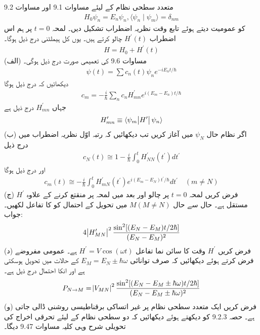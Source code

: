 متعدد سطحی نظام کے لیئے مساوات \num{9.1} اور مساوات \num{9.2} 
\begin{align}
	H_0\psi_n = E_n\psi_n, \langle \psi_n\mid\psi_m \rangle = \delta_{nm}
\end{align}
کو عمومیت دیتے ہوئے تابع وقت نظریہ اضطراب تشکیل دیں۔ لمحہ \(t=0\) پر ہم اس اضطراب \(H^\prime(t)\) چالو کرتے ہیں۔ یوں کل ہیملٹنی درج ذیل ہوگا۔
\begin{align}
	H = H_0 + H^\prime(t)
\end{align}
(الف) مساوات \num{9.6} کی تعمیمی صورت درج ذیل ہوگی۔
\begin{align}
	\psi(t) = \sum c_n(t)\psi_ne^{-iE_nt/\hbar}
\end{align}
دیکھائیں کہ درج ذیل ہوگا
\begin{align}
	c_m = -\frac{i}{\hbar}\sum_{n} c_nH^\prime_{mn}e^{i(E_m-E_n)t/\hbar}
\end{align}
جہاں \(H^\prime_{mn}\) درج ذیل ہے
\begin{align}
	H^\prime_{mn} \equiv \langle \psi_m\abs{H^\prime}\psi_n \rangle
\end{align}
(ب) اگر نظام حال \(\psi_N\) میں آغاز کریں تب دیکھائیں کہ رتبہ اوّل نظریہ اضطراب میں درج ذیل
\begin{align}
	c_N(t)\cong1-\frac{i}{\hbar}\int_{0}^{t}H^\prime_{NN}(t^\prime)dt^\prime
\end{align}
اور درج ذیل ہوگا
\begin{align}
	c_m(t)\cong-\frac{i}{\hbar}\int_{0}^{t}H^\prime_{mN}(t^\prime)e^{i(E_m-E_N)t^\prime/\hbar}dt^\prime \quad(m\neq N)
\end{align}
(ج) فرض کریں لمحہ \(t=0\) پر چالو اور بعد میں لمحہ  پر منقتع کرنے کے علاوہ \(H^\prime\) مستقل ہے۔ حال  سے حال \(M(M\neq N)\) میں تحویل کے احتمال کو  کا تفاعل لکھیں۔ جواب:
\begin{align}
	4\abs{H^\prime_{MN}}^2\frac{\sin^2[(E_N-E_M)t/2\hbar]}{(E_N-E_M)^2}
\end{align}
(د) فرض کریں \(H^\prime\) وقت کا سائن نما تفاعل \(H^\prime=V\cos(\omega t)\) ہے۔ عمومی مفروضے فرض کرتے ہوئے دیکھائیں کہ صرف توانائی \(E_M = E_N\pm\hbar\omega\) کے حالات میں تحویل ہوسکتی ہے اور انکا احتمال درج ذیل ہے۔
\begin{align}
	P_{N\rightarrow M} = \abs{V_{MN}}^2\frac{\sin^2[(E_N-E_M\pm\hbar\omega)t/2\hbar]}{(E_N-E_M\pm\hbar\omega)^2}
\end{align}
(و) فرض کریں ایک متعدد سطحی نظام پر غیر اتساکی برقناطیسی روشنی ڈالی جاتی ہے۔ حصہ 9.2.3 کو دیکھتے ہوئے دیکھائیں کہ دو سطحی نظام کے لیئے تحرقی اخراج کی تحویلی شرح وہی کلیہ مساوات \num{9.47} دیگا۔
